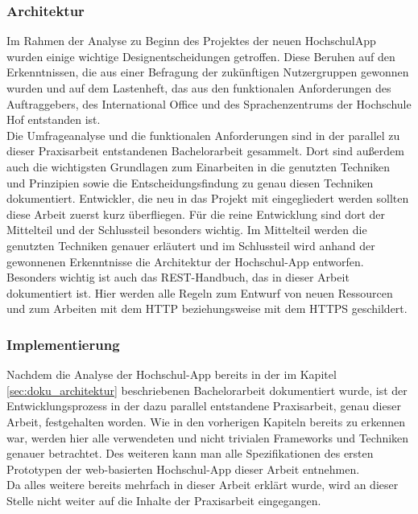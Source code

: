 \subsubsection*{Architektur}
\label{sec:doku_architektur}
Im Rahmen der Analyse zu Beginn des Projektes der neuen Hoch\-schul\ac{App} wurden einige wichtige Designentscheidungen getroffen. Diese Beruhen auf den Erkenntnissen, die aus einer Befragung der zukünftigen Nutzergruppen gewonnen wurden und auf dem Lastenheft, das aus den funktionalen Anforderungen des Auftraggebers, des International Office und des Sprachenzentrums der Hochschule Hof entstanden ist.\\
\linebreak
Die Umfrageanalyse und die funktionalen Anforderungen sind in der parallel zu dieser Praxisarbeit entstandenen Bachelorarbeit gesammelt\autocite[Siehe][]{dnba}. Dort sind außerdem auch die wichtigsten Grundlagen zum Einarbeiten in die genutzten Techniken und Prinzipien sowie die Entscheidungsfindung zu genau diesen Techniken dokumentiert. Entwickler, die neu in das Projekt mit eingegliedert werden sollten diese Arbeit zuerst kurz überfliegen. Für die reine Entwicklung sind dort der Mittelteil und der Schlussteil besonders wichtig. Im Mittelteil werden die genutzten Techniken genauer erläutert und im Schlussteil wird anhand der gewonnenen Erkenntnisse die Architektur der Hoch\-schul-\ac{App} entworfen.\\
\linebreak
Besonders wichtig ist auch das \ac{REST}-Handbuch, das in dieser Arbeit dokumentiert ist. Hier werden alle Regeln zum Entwurf von neuen Ressourcen und zum Arbeiten mit dem \ac{HTTP} beziehungsweise mit dem \ac{HTTPS} geschildert.

\subsubsection*{Implementierung}
\label{sec:doku_implementierung}
Nachdem die Analyse der Hoch\-schul-\ac{App} bereits in der im Kapitel \ref{sec:doku_architektur} beschriebenen Bachelorarbeit dokumentiert wurde, ist der Entwicklungsprozess in der dazu parallel entstandene Praxisarbeit, genau dieser Arbeit, festgehalten worden\autocite[Siehe][]{dnpa}. Wie in den vorherigen Kapiteln bereits zu erkennen war, werden hier alle verwendeten und nicht trivialen Frameworks und Techniken genauer betrachtet. Des weiteren kann man alle Spezifikationen des ersten Prototypen der web-basierten Hoch\-schul-\ac{App} dieser Arbeit entnehmen.\\
\linebreak
Da alles weitere bereits mehrfach in dieser Arbeit erklärt wurde, wird an dieser Stelle nicht weiter auf die Inhalte der Praxisarbeit eingegangen.

